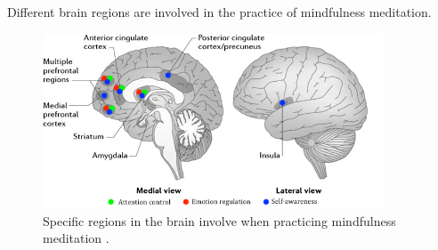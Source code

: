 



Different brain regions are involved in the practice of mindfulness meditation. 

\begin{figure}[H]
	\includegraphics[width=0.9\textwidth]{figures/brain_meditation.png} 
	\caption{Specific regions in the brain involve when practicing mindfulness meditation \cite{Tang2017}.}
	\label{fig:brain_meditation}  
\end{figure}

